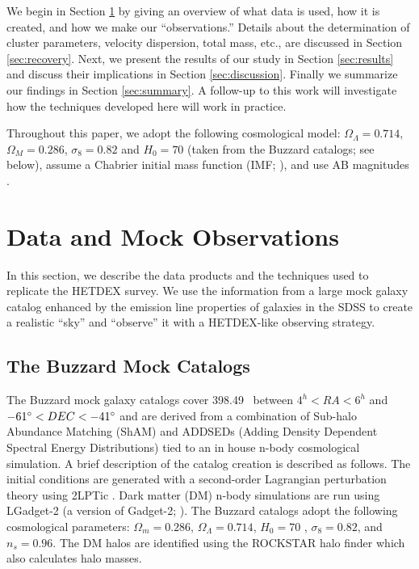 We begin in Section \ref{sec:Data} by giving an overview of what data is used, how it is created, and how we make our ``observations.'' Details about the determination of cluster parameters, velocity dispersion, total mass, etc., are discussed in Section \ref{sec:recovery}. Next, we present the results of our study in Section \ref{sec:results} and discuss their implications in Section \ref{sec:discussion}. Finally we summarize our findings in Section \ref{sec:summary}. A follow-up to this work \citep{Boada2016a} will investigate how the techniques developed here will work in practice. 

Throughout this paper, we adopt the following cosmological model: $\Omega_\Lambda = 0.714$, $\Omega_M = 0.286$, $\sigma_8 = 0.82$ and $H_0= 70$ \kms \mpc (taken from the Buzzard catalogs; see below), assume a Chabrier initial mass function (IMF; \citealt{Chabrier2003}), and use AB magnitudes \citep{Oke1974}.

\section{Data and Mock Observations}\label{sec:Data}
In this section, we describe the data products and the techniques used to replicate the HETDEX survey. We use the information from a large mock galaxy catalog enhanced by the emission line properties of galaxies in the SDSS to create a realistic ``sky'' and ``observe'' it with a HETDEX-like observing strategy.

\subsection{The Buzzard Mock Catalogs}
The Buzzard mock galaxy catalogs cover 398.49 \degsq\ between $4^h< RA < 6^h$ and $-61\hbox{$^\circ$} < DEC < -41\hbox{$^\circ$}$ and are derived from a combination of Sub-halo Abundance Matching (ShAM) and ADDSEDs (Adding Density Dependent Spectral Energy Distributions) tied to an in house n-body cosmological simulation. A brief description of the catalog creation is described as follows. The initial conditions are generated with a second-order Lagrangian perturbation theory using {\sc 2LPTic} \citep{Crocce2006}. Dark matter (DM) n-body simulations are run using {\sc LGadget-2} (a version of {\sc Gadget-2}; \citealt{Springel2005}). The Buzzard catalogs adopt the following cosmological parameters: $\Omega_m = 0.286$, $\Omega_\Lambda = 0.714$, $H_0 = 70$ \kms \mpc, $\sigma_8 = 0.82$, and $n_s = 0.96$. The DM halos are identified using the {\sc ROCKSTAR} halo finder \citep{Behroozi2013} which also calculates halo masses. 


